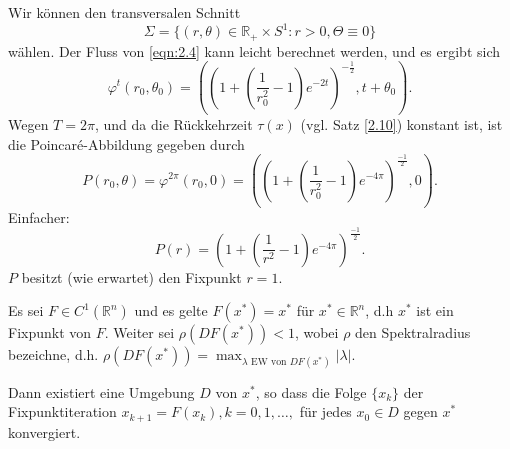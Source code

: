 \documentclass[main.tex]{subfiles}
\begin{document}
\begin{bsp}
\begin{center}
\end{center}

Wir können den transversalen Schnitt
$$Σ = \{ (r,θ) \in ℝ_+ \times S^1: r>0, Θ \equiv 0 \}$$
wählen. 
Der Fluss von \eqref{eqn:2.4} kann leicht berechnet werden, und es ergibt sich
$$φ^t ( r_0, θ_0) = \left( \left( 1 + \left( \frac{1}{r_0^2} - 1 \right) e^{-2t} \right)^{-\frac{1}{2}} , t+ θ_0 \right).$$
Wegen $T = 2π$, und da die Rückkehrzeit $τ(x)$ (vgl. Satz \ref{2.10}) konstant ist, ist die Poincaré-Abbildung gegeben durch
$$P(r_0, θ) = φ^{2π} (r_0, 0) = \left( \left( 1 +  \left( \frac{1}{r_0^2} - 1 \right) e^{-4π} \right)^{\frac{-1}{2}},0\right).$$
Einfacher: 
$$P(r)= \left( 1 + \left( \frac{1}{r^2} - 1 \right) e^{-4π} \right) ^{\frac{-1}{2}}.$$
$P$ besitzt (wie erwartet) den Fixpunkt $r=1$.
\end{bsp}

\begin{bem*}
Es sei $F\in C^1(ℝ^n)$ und es gelte $F(x^*) = x^*$ für $x^* \in ℝ^n$, d.h $x^*$ ist ein Fixpunkt von $F$. Weiter sei $ρ(DF(x^*))<1$, wobei $ρ$ den Spektralradius bezeichne,
d.h. $ρ(DF(x^*)) = \max_{λ\text{ EW von $DF(x^*)$}} |λ|$.

Dann existiert eine Umgebung $D$ von $x^*$, so dass die Folge $\{x_k\}$ der Fixpunktiteration $x_{k+1} = F(x_k), k=0,1,…,$ für jedes $x_0\in D$ gegen $x^*$ konvergiert.
\end{bem*}
\end{document}
